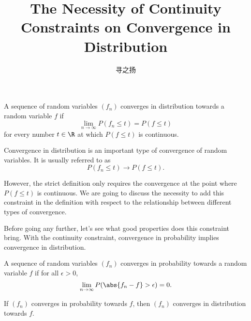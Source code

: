 

\title{The Necessity of Continuity Constraints on Convergence in Distribution}
\author{寻之扬}

    \maketitle

    \begin{tcolorbox}
        \begin{definition}
            A sequence of random variables $(f_n)$ converges in distribution towards a random variable $f$ if
            \[ \lim_{n \to \infty} P(f_n \leq t) = P(f \leq t) \]
            for every number $t \in \R$ at which $P(f \leq t)$ is continuous.
        \end{definition}
    \end{tcolorbox}

    Convergence in distribution is an important type of convergence of random variables. It is usually referred to as \[
        P(f_n \leq t) \to P(f \leq t).    
    \] 

    However, the strict definition only requires the convergence at the point where $P(f \leq t)$ is continuous. We are going to discuss the necessity to add this constraint in the definition with respect to the relationship between different types of convergence.

    Before going any further, let's see what good properties does this constraint bring. With the continuity constraint, convergence in probability implies convergence in distribution.

    \begin{definition}
        A sequence of random variables $(f_n)$ converges in probability towards a random variable $f$ if for all $\epsilon > 0$,
        \[ \lim_{n \to \infty} P(\abs{f_n - f} > \epsilon) = 0.\]
    \end{definition}

    \begin{theorem}
        If $(f_n)$ converges in probability towards $f$, then $(f_n)$ converges in distribution towards $f$.
    \end{theorem}

